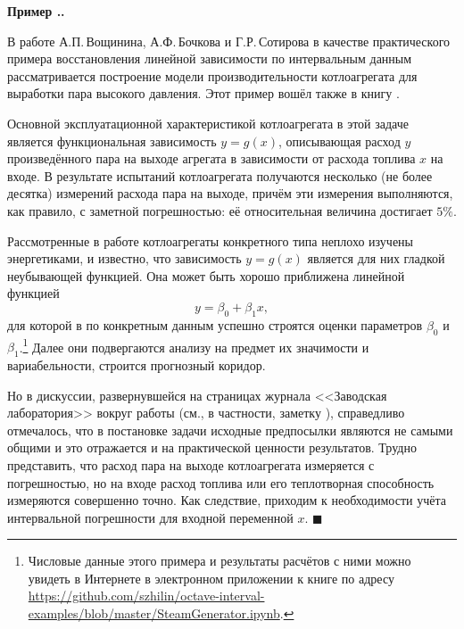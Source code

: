 \documentclass[a5paper,openany]{book}
\newcounter{ExmpNum}[section]
\renewcommand{\theExmpNum}{\thesection.\arabic{ExmpNum}}
\newenvironment{example}%
  {\refstepcounter{ExmpNum}%
  \par\addvspace{\medskipamount} 
  \noindent\textbf{Пример {\theExmpNum}.}
  }%
  {\hfill$\blacksquare$\par\medskip}
\begin{document}
\begin{example} 
В работе А.П.\,Вощинина, А.Ф.\,Бочкова и Г.Р.\,Сотирова \cite{VoschiBochkovSotirov} 
в качестве практического примера восстановления линейной зависимости по интервальным 
данным рассматривается построение модели производительности котлоагрегата для выработки 
пара высокого давления. Этот пример вошёл также в книгу \cite{VoschininSotirov}. 
  
Основной эксплуатационной характеристикой котлоагрегата в этой задаче является 
функциональная зависимость $y = g(x)$, описывающая расход $y$ произведённого пара 
на выходе агрегата в зависимости от расхода топлива $x$ на входе. В результате 
испытаний котлоагрегата получаются несколько (не более десятка) измерений расхода 
пара на выходе, причём эти измерения выполняются, как правило, с заметной погрешностью: 
её относительная величина достигает $5\%$. 
  
Рассмотренные в работе \cite{VoschiBochkovSotirov} котлоагрегаты конкретного типа 
неплохо изучены энергетиками, и известно, что зависимость $y = g(x)$ является для них 
гладкой неубывающей функцией. Она может быть хорошо приближена линейной функцией 
\begin{equation*} 
y = \beta_{0} + \beta_{1}x,
\end{equation*} 
для которой в \cite{VoschiBochkovSotirov} по конкретным данным успешно строятся оценки 
параметров $\beta_0$ и $\beta_1$.\footnote{Числовые данные этого примера и результаты 
расчётов с ними можно увидеть в Интернете в электронном приложении к книге по адресу 
\url{https://github.com/szhilin/octave-interval-examples/blob/master/SteamGenerator.ipynb}.}
Далее они подвергаются анализу на предмет их значимости и вариабельности, строится 
прогнозный коридор. 
  
Но в дискуссии, развернувшейся на страницах журнала <<Заводская лаборатория>> 
вокруг работы \cite{VoschiBochkovSotirov} (см., в частности, заметку 
\cite{DemidenkoNote}), справедливо отмечалось, что в постановке задачи исходные 
предпосылки являются не самыми общими и это отражается и на практической ценности 
результатов. Трудно представить, что расход пара на выходе котлоагрегата измеряется 
с погрешностью, но на входе расход топлива или его теплотворная способность измеряются 
совершенно точно. Как следствие, приходим к необходимости учёта интервальной 
погрешности для входной переменной $x$. 
\end{example} 
  
\end{document}
